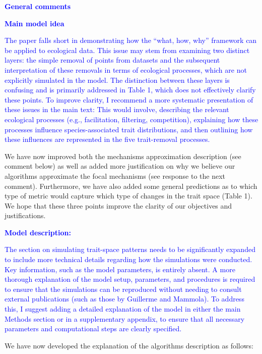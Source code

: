 \documentclass[
]{article}
\begin{document}
\textcolor{blue}{\textbf{General comments}}

\textcolor{blue}{\textbf{Main model idea}}

\textcolor{blue}{The paper falls short in demonstrating how the ``what, how, why'' framework can be applied to ecological data.
This issue may stem from examining two distinct layers: the simple removal of points from datasets and the subsequent interpretation of these removals in terms of ecological processes, which are not explicitly simulated in the model.
The distinction between these layers is confusing and is primarily addressed in Table 1, which does not effectively clarify these points.
To improve clarity, I recommend a more systematic presentation of these issues in the main text: This would involve, describing the relevant ecological processes (e.g., facilitation, filtering, competition), explaining how these processes influence species-associated trait distributions, and then outlining how these influences are represented in the five trait-removal processes.}

We have now improved both the mechanisms approximation description (see comment below) as well as added more justification on why we believe our algorithms approximate the focal mechanisms (see response to the next comment).
Furthermore, we have also added some general predictions as to which type of metric would capture which type of changes in the trait space (Table 1).
We hope that these three points improve the clarity of our objectives and justifications.

\textcolor{blue}{\textbf{Model description:}}

\textcolor{blue}{The section on simulating trait-space patterns needs to be significantly expanded to include more technical details regarding how the simulations were conducted.
Key information, such as the model parameters, is entirely absent.
A more thorough explanation of the model setup, parameters, and procedures is required to ensure that the simulations can be reproduced without needing to consult external publications (such as those by Guillerme and Mammola).
To address this, I suggest adding a detailed explanation of the model in either the main Methods section or in a supplementary appendix, to ensure that all necessary parameters and computational steps are clearly specified.}

We have now developed the explanation of the algorithms description as follows:
\end{document}
